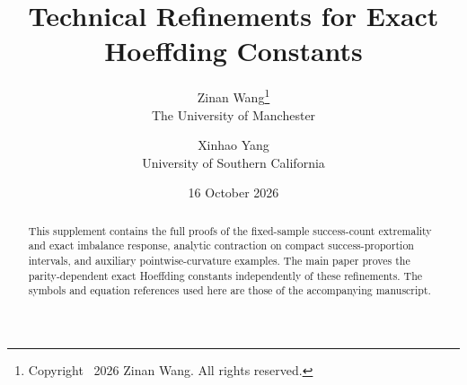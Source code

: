 \documentclass[11pt,a4paper]{article}
\title{\bfseries Technical Refinements for Exact Hoeffding Constants}
\author{Zinan Wang\thanks{Copyright \textcopyright\ 2026 Zinan Wang. All rights reserved.}\\{\small The University of Manchester}\and Xinhao Yang\\{\small University of Southern California}}
\date{16 October 2026}
\begin{document}
\maketitle
\begin{abstract}
This supplement contains the full proofs of the fixed-sample success-count extremality and exact imbalance response, analytic contraction on compact success-proportion intervals, and auxiliary pointwise-curvature examples. The main paper proves the parity-dependent exact Hoeffding constants independently of these refinements. The symbols and equation references used here are those of the accompanying manuscript.
\end{abstract}



\end{document}
